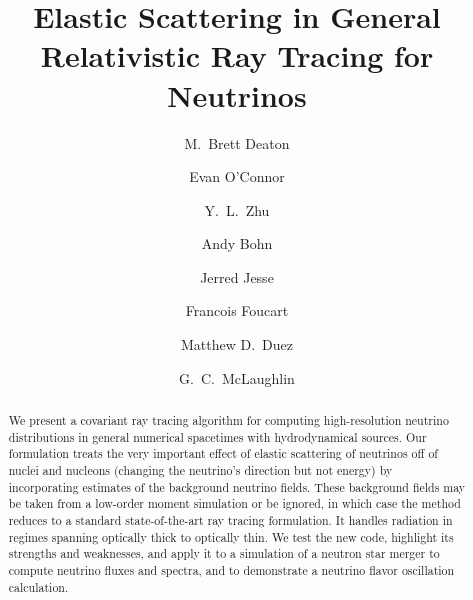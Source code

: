 \documentclass[aps,floatfix,prd,superscriptaddress,twocolumn]{revtex4-1}
\begin{document}
\widetext
{}

\title{Elastic Scattering in General Relativistic Ray Tracing for Neutrinos}

\author{M.\ Brett Deaton}

\author{Evan O'Connor}

\author{Y.\ L.\ Zhu}

\author{Andy Bohn}

\author{Jerred Jesse}

\author{Francois Foucart}

\author{Matthew D.\ Duez}

\author{G.\ C.\ McLaughlin}


\begin{abstract}
  We present a covariant ray tracing algorithm for computing high-resolution
  neutrino distributions in general numerical spacetimes with hydrodynamical
  sources.
  Our formulation treats the very important effect of
  elastic scattering of neutrinos off of nuclei and nucleons
  (changing the neutrino's direction but not energy)
  by incorporating estimates of the background neutrino fields.
  These background fields may be taken from a low-order moment simulation
  or be ignored, in which case the method
  reduces to a standard state-of-the-art ray tracing formulation.
  It handles radiation in regimes spanning optically thick to optically thin.
  We test the new code, highlight its strengths and weaknesses,
  and apply it to a simulation of a neutron star merger
  to compute neutrino fluxes and spectra,
  and to demonstrate a neutrino flavor oscillation calculation.
\end{abstract}
\end{document}
